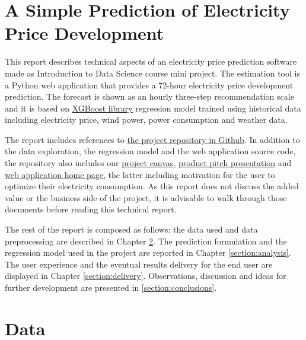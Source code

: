 \documentclass{article}
\begin{document}


\tableofcontents

\vspace{30.0 cm}

\section{A Simple Prediction of Electricity Price Development}
\label{section:introduction}

This report describes technical aspects of an electricity price prediction software made as Introduction to Data Science course mini project. The estimation tool is a Python web application that provides a 72-hour electricity price development prediction. The forecast is shown as an hourly three-step recommendation scale and it is based on \href{https://xgboost.ai/}{XGBoost library} regression model trained using historical data including electricity price, wind power, power consumption and weather data.

The report includes references to \href{https://github.com/IDS-mini/electricity}{the project repository in Github}. In addition to the data exploration, the regression model and the web application source code, the repository also includes our \href{https://github.com/IDS-mini/electricity/blob/main/marketing/Mini-Project-Canvas-Hedlund-Korpi-Ranta.pdf}{project canvas}, \href{https://github.com/IDS-mini/electricity/blob/main/marketing/presentation.pptx}{product pitch presentation} and \href{https://github.com/IDS-mini/electricity/blob/main/src/app/templates/index.html}{web application home page}, the latter including motivation for the user to optimize their electricity consumption. As this report does not discuss the added value or the business side of the project, it is advisable to walk through those documents before reading this technical report.

The rest of the report is composed as follows: the data used and data preprocessing are described in Chapter \ref{section:data}. The prediction formulation and the regression model used in the project are reported in Chapter \ref{section:analysis}. The user experience and the eventual results delivery for the end user are displayed in Chapter \ref{section:delivery}. Observations, discussion and ideas for further development are presented in \ref{section:conclusions}.

\section{Data}
\label{section:data}
\end{document}
